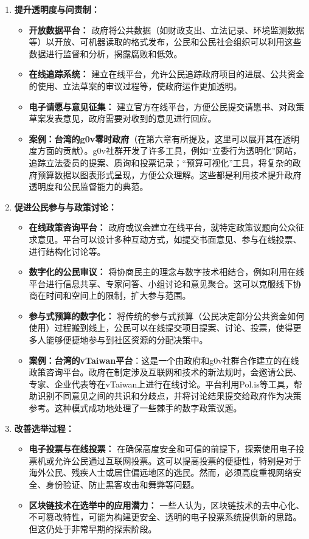 \documentclass[UTF8, 10pt]{ctexbook}
\begin{document}
\begin{enumerate}
    \item  \textbf{提升透明度与问责制：}
    \begin{itemize}
        \item \textbf{开放数据平台：} 政府将公共数据（如财政支出、立法记录、环境监测数据等）以开放、可机器读取的格式发布，公民和公民社会组织可以利用这些数据进行监督和分析，揭露腐败和低效。
        \item \textbf{在线追踪系统：} 建立在线平台，允许公民追踪政府项目的进展、公共资金的使用、立法草案的审议过程等，使政府运作更加透明。
        \item \textbf{电子请愿与意见征集：} 建立官方在线平台，方便公民提交请愿书、对政策草案发表意见，政府需要对收到的意见进行回应。
        \item \textbf{案例：台湾的g0v零时政府}（在第六章有所提及，这里可以展开其在透明度方面的贡献）。g0v社群开发了许多工具，例如“立委行为透明化”网站，追踪立法委员的提案、质询和投票记录；“预算可视化”工具，将复杂的政府预算数据以图表形式呈现，方便公众理解。这些都是利用技术提升政府透明度和公民监督能力的典范。
    \end{itemize}
    \item  \textbf{促进公民参与与政策讨论：}
    \begin{itemize}
        \item \textbf{在线政策咨询平台：} 政府或议会建立在线平台，就特定政策议题向公众征求意见。平台可以设计多种互动方式，如提交书面意见、参与在线投票、进行结构化讨论等。
        \item \textbf{数字化的公民审议：} 将协商民主的理念与数字技术相结合，例如利用在线平台进行信息共享、专家问答、小组讨论和意见聚合。这可以克服线下协商在时间和空间上的限制，扩大参与范围。
        \item \textbf{参与式预算的数字化：} 将传统的参与式预算（公民决定部分公共资金如何使用）过程搬到线上，公民可以在线提交项目提案、讨论、投票，使得更多人能够便捷地参与到社区资源的分配决策中。
        \item \textbf{案例：台湾的vTaiwan平台}：这是一个由政府和g0v社群合作建立的在线政策咨询平台。政府在制定涉及互联网和技术的新法规时，会邀请公民、专家、企业代表等在vTaiwan上进行在线讨论。平台利用Pol.is等工具，帮助识别不同意见之间的共识和分歧点，并将讨论结果提交给政府作为决策参考。这种模式成功地处理了一些棘手的数字政策议题。
    \end{itemize}
    \item  \textbf{改善选举过程：}
    \begin{itemize}
        \item \textbf{电子投票与在线投票：} 在确保高度安全和可信的前提下，探索使用电子投票机或允许公民通过互联网投票。这可以提高投票的便捷性，特别是对于海外公民、残疾人士或居住偏远地区的选民。然而，必须高度重视网络安全、身份验证、防止黑客攻击和舞弊等问题。
        \item \textbf{区块链技术在选举中的应用潜力：} 一些人认为，区块链技术的去中心化、不可篡改特性，可能为构建更安全、透明的电子投票系统提供新的思路。但这仍处于非常早期的探索阶段。
    \end{itemize}
\end{enumerate}
\end{document}

